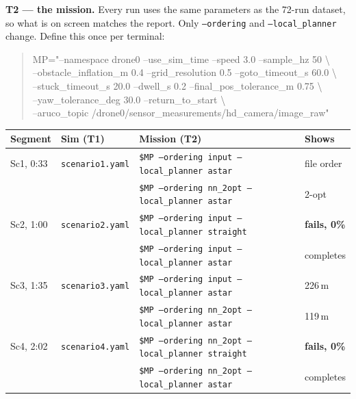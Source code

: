 \documentclass[11pt,a4paper]{article}
\begin{document}
\noindent\textbf{T2 --- the mission.} Every run uses the same parameters as the
72-run dataset, so what is on screen matches the report. Only
\texttt{--ordering} and \texttt{--local\_planner} change. Define this once per
terminal:
\begin{quote}\ttfamily
\footnotesize
MP="--namespace drone0 --use\_sim\_time --speed 3.0 --sample\_hz 50 \textbackslash\\
\hspace*{2em}--obstacle\_inflation\_m 0.4 --grid\_resolution 0.5 --goto\_timeout\_s 60.0 \textbackslash\\
\hspace*{2em}--stuck\_timeout\_s 20.0 --dwell\_s 0.2 --final\_pos\_tolerance\_m 0.75 \textbackslash\\
\hspace*{2em}--yaw\_tolerance\_deg 30.0 --return\_to\_start \textbackslash\\
\hspace*{2em}--aruco\_topic /drone0/sensor\_measurements/hd\_camera/image\_raw"
\end{quote}

\begin{table}[H]
\centering\small
\begin{tabular}{llll}
\toprule
\textbf{Segment} & \textbf{Sim (T1)} & \textbf{Mission (T2)} & \textbf{Shows} \\
\midrule
Sc1, 0:33 & \texttt{scenario1.yaml} & \texttt{\$MP --ordering input --local\_planner astar}   & file order \\
          &                         & \texttt{\$MP --ordering nn\_2opt --local\_planner astar} & 2-opt \\
\midrule
Sc2, 1:00 & \texttt{scenario2.yaml} & \texttt{\$MP --ordering input --local\_planner straight} & \textbf{fails, 0\%} \\
          &                         & \texttt{\$MP --ordering input --local\_planner astar}    & completes \\
\midrule
Sc3, 1:35 & \texttt{scenario3.yaml} & \texttt{\$MP --ordering input --local\_planner astar}    & 226\,m \\
          &                         & \texttt{\$MP --ordering nn\_2opt --local\_planner astar}  & 119\,m \\
\midrule
Sc4, 2:02 & \texttt{scenario4.yaml} & \texttt{\$MP --ordering nn\_2opt --local\_planner straight} & \textbf{fails, 0\%} \\
          &                         & \texttt{\$MP --ordering nn\_2opt --local\_planner astar}    & completes \\
\bottomrule
\end{tabular}
\end{table}
\end{document}
